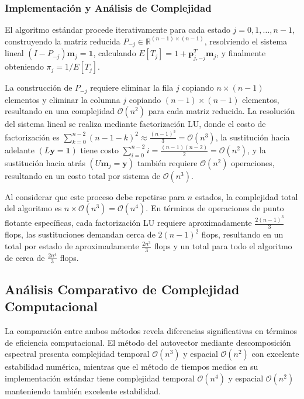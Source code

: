 \subsubsection{Implementación y Análisis de Complejidad}

El algoritmo estándar procede iterativamente para cada estado $j = 0, 1, \ldots, n-1$, construyendo la matriz reducida $P_{-j} \in \mathbb{R}^{(n-1) \times (n-1)}$, resolviendo el sistema lineal $(I - P_{-j}) \mathbf{m}_j = \mathbf{1}$, calculando $E[T_j] = 1 + \mathbf{p}_{j,-j}^T \mathbf{m}_j$, y finalmente obteniendo $\pi_j = 1/E[T_j]$.

La construcción de $P_{-j}$ requiere eliminar la fila $j$ copiando $n \times (n-1)$ elementos y eliminar la columna $j$ copiando $(n-1) \times (n-1)$ elementos, resultando en una complejidad $\mathcal{O}(n^2)$ para cada matriz reducida. La resolución del sistema lineal se realiza mediante factorización LU, donde el costo de factorización es $\sum_{k=0}^{n-2} (n-1-k)^2 \approx \frac{(n-1)^3}{3} = \mathcal{O}(n^3)$, la sustitución hacia adelante $(L\mathbf{y} = \mathbf{1})$ tiene costo $\sum_{i=0}^{n-2} i = \frac{(n-1)(n-2)}{2} = \mathcal{O}(n^2)$, y la sustitución hacia atrás $(U\mathbf{m}_j = \mathbf{y})$ también requiere $\mathcal{O}(n^2)$ operaciones, resultando en un costo total por sistema de $\mathcal{O}(n^3)$.

Al considerar que este proceso debe repetirse para $n$ estados, la complejidad total del algoritmo es $n \times \mathcal{O}(n^3) = \mathcal{O}(n^4)$. En términos de operaciones de punto flotante específicas, cada factorización LU requiere aproximadamente $\frac{2(n-1)^3}{3}$ flops, las sustituciones demandan cerca de $2(n-1)^2$ flops, resultando en un total por estado de aproximadamente $\frac{2n^3}{3}$ flops y un total para todo el algoritmo de cerca de $\frac{2n^4}{3}$ flops.

\subsection{Análisis Comparativo de Complejidad Computacional}

La comparación entre ambos métodos revela diferencias significativas en términos de eficiencia computacional. El método del autovector mediante descomposición espectral presenta complejidad temporal $\mathcal{O}(n^3)$ y espacial $\mathcal{O}(n^2)$ con excelente estabilidad numérica, mientras que el método de tiempos medios en su implementación estándar tiene complejidad temporal $\mathcal{O}(n^4)$ y espacial $\mathcal{O}(n^2)$ manteniendo también excelente estabilidad.

